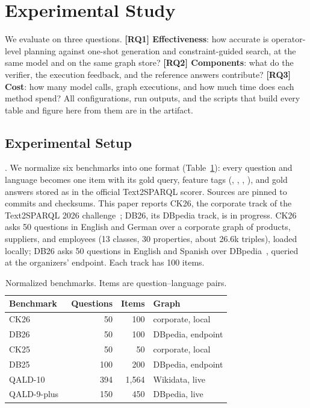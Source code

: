\section{Experimental Study}
\label{sec-exp}

We evaluate \hermes on three questions.
\textbf{[RQ1] Effectiveness}: how accurate is operator-level planning
against one-shot generation and constraint-guided search, at the same
model and on the same graph store?
\textbf{[RQ2] Components}: what do the verifier, the execution feedback,
and the reference answers contribute?
\textbf{[RQ3] Cost}: how many model calls, graph executions, and how
much time does each method spend?
All configurations, run outputs, and the scripts that build every table
and figure here from them are in the artifact.

\subsection{Experimental Setup}

.
We normalize six benchmarks into one format
(Table~\ref{tab-bench}): every question and language becomes one item
with its gold query, feature tags (\eg {}, ,
, ), and gold answers stored as in the official
Text2SPARQL scorer.
Sources are pinned to commits and checksums.
This paper reports CK26, the corporate track of the Text2SPARQL 2026
challenge~\cite{text2sparql}; DB26, its DBpedia track, is in progress.
CK26 asks 50 questions in English and German over a corporate graph of
products, suppliers, and employees (13 classes, 30 properties, about
26.6k triples), loaded locally; DB26 asks 50 questions in English and
Spanish over DBpedia~\cite{auer2007dbpedia}, queried at the organizers'
endpoint.
Each track has 100 items.

\begin{table}[t]
  \caption{Normalized benchmarks. Items are question--language pairs.}
  \label{tab-bench}
  \small
  \begin{tabular}{@{}lrrl@{}}
    \toprule
    Benchmark & Questions & Items & Graph \\
    \midrule
    CK26~\cite{text2sparql} & 50 & 100 & corporate, local \\
    DB26~\cite{text2sparql} & 50 & 100 & DBpedia, endpoint \\
    CK25~\cite{text2sparql2025} & 50 & 50 & corporate, local \\
    DB25~\cite{text2sparql2025} & 100 & 200 & DBpedia, endpoint \\
    QALD-10~\cite{qald10} & 394 & 1,564 & Wikidata, live \\
    QALD-9-plus~\cite{qald9plus} & 150 & 450 & DBpedia, live \\
    \bottomrule
  \end{tabular}
\end{table}

